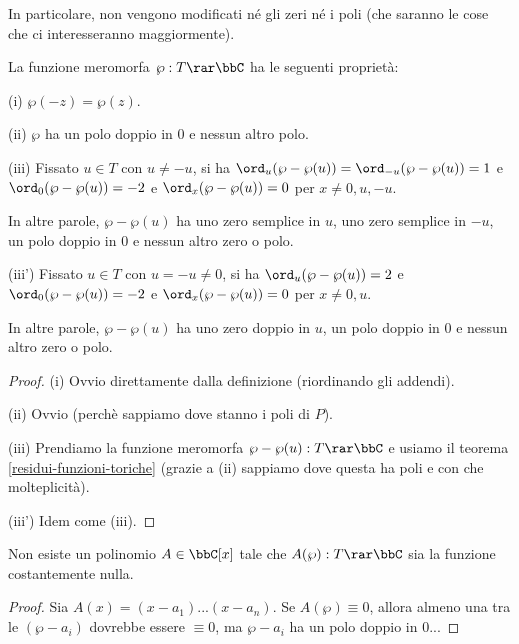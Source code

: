 In particolare, non vengono modificati né gli zeri né i poli (che saranno le cose che ci interesseranno maggiormente).


\begin{proposizione}
La funzione meromorfa $\wp:T\rar\bbC$ ha le seguenti proprietà:

(i) $\wp(-z)=\wp(z)$.

(ii) $\wp$ ha un polo doppio in $0$ e nessun altro polo.

(iii) Fissato $u\in T$ con $u\not=-u$, si ha $\ord_u(\wp-\wp(u))=\ord_{-u}(\wp-\wp(u))=1$ e $\ord_0(\wp-\wp(u))=-2$ e $\ord_x(\wp-\wp(u))=0$ per $x\not=0,u,-u$.

In altre parole, $\wp-\wp(u)$ ha uno zero semplice in $u$, uno zero semplice in $-u$, un polo doppio in $0$ e nessun altro zero o polo.

(iii') Fissato $u\in T$ con $u=-u\not=0$, si ha $\ord_u(\wp-\wp(u))=2$ e $\ord_0(\wp-\wp(u))=-2$ e $\ord_x(\wp-\wp(u))=0$ per $x\not=0,u$.

In altre parole, $\wp-\wp(u)$ ha uno zero doppio in $u$, un polo doppio in $0$ e nessun altro zero o polo.
\end{proposizione}
\begin{proof}
(i) Ovvio direttamente dalla definizione (riordinando gli addendi).

(ii) Ovvio (perchè sappiamo dove stanno i poli di $P$).

(iii) Prendiamo la funzione meromorfa $\wp-\wp(u):T\rar\bbC$ e usiamo il teorema \ref{residui-funzioni-toriche} (grazie a (ii) sappiamo dove questa ha poli e con che molteplicità).

(iii') Idem come (iii).
\end{proof}


\begin{teorema}
Non esiste un polinomio $A\in\bbC[x]$ tale che $A(\wp):T\rar\bbC$ sia la funzione costantemente nulla.
\end{teorema}
\begin{proof}
Sia $A(x)=(x-a_1)...(x-a_n)$. Se $A(\wp)\equiv0$, allora almeno una tra le $(\wp-a_i)$ dovrebbe essere $\equiv0$, ma $\wp-a_i$ ha un polo doppio in $0$...
\end{proof}


